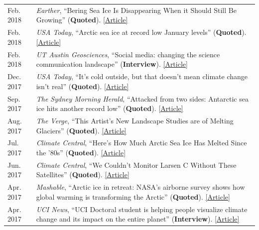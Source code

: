 \documentclass[margin,line,palatino,courier,10pt]{res}
\begin{document}
\begin{resume}
\begin{tabular}{@{}p{0.9in}p{4in}}
Feb. 2018 & \textit{Earther}, ``Bering Sea Ice Is Disappearing When it Should Still Be Growing'' (\textbf{Quoted}). \href{https://earther.com/bering-sea-ice-is-disappearing-at-a-time-when-it-should-1823193914}{[Article]}\\
Feb. 2018 & \textit{USA Today}, ``Arctic sea ice at record low January levels'' (\textbf{Quoted}). \href{https://www.usatoday.com/story/weather/2018/02/20/arctic-sea-ice-record-low-january-levels/355738002/}{[Article]}\\
Feb. 2018 & \textit{UT Austin Geosciences}, ``Social media: changing the science communication landscape'' (\textbf{Interview}). \href{https://www.jsg.utexas.edu/science-yall/social-media-landscape/}{[Article]}\\
Dec. 2017 & \textit{USA Today}, ``It's cold outside, but that doesn't mean climate change isn't real'' (\textbf{Quoted}). \href{https://www.usatoday.com/story/weather/2017/12/28/its-cold-outside-but-doesnt-mean-climate-change-isnt-real/987948001/}{[Article]}\\
Sep. 2017 & \textit{The Sydney Morning Herald}, ``Attacked from two sides: Antarctic sea ice hits another record low'' (\textbf{Quoted}). \href{http://www.smh.com.au/environment/climate-change/attacked-from-two-sides-antarctic-sea-ice-hits-another-record-low-20170926-gyouuc.html}{[Article]}\\
Aug. 2017 & \textit{The Verge}, ``This Artist's New Landscape Studies are of Melting Glaciers'' (\textbf{Quoted}). \href{https://www.theverge.com/2017/8/22/16171276/anthropocene-nasa-justin-brice-guariglia-photography-climate-change}{[Article]}\\
Jul. 2017 & \textit{Climate Central}, ``Here's How Much Arctic Sea Ice Has Melted Since the '80s'' (\textbf{Quoted}). \href{http://www.climatecentral.org/news/arctic-sea-ice-melt-since-the-80s-21637}{[Article]}\\
Jun. 2017 & \textit{Climate Central}, ``We Couldn't Monitor Larsen C Without These Satellites'' (\textbf{Quoted}). \href{http://www.climatecentral.org/news/larsen-c-monitoring-satellites-21564}{[Article]}\\
Apr. 2017 & \textit{Mashable}, ``Arctic ice in retreat: NASA's airborne survey shows how global warming is transforming the Arctic'' (\textbf{Quoted}). \href{http://mashable.com/2017/04/13/arctic-meltdown-nasa-photos-changing-ice/?utm_cid=hp-n-1#BgdepWyM6Pq3}{[Article]}\\
Apr. 2017 & \textit{UCI News}, ``UCI Doctoral student is helping people visualize climate change and its impact on the entire planet'' (\textbf{Interview}). \href{http://grad.uci.edu/news-and-events/student-spotlights/Zachary-Labe.html}{[Article]}\\

\end{tabular}
\end{resume}
\end{document}
